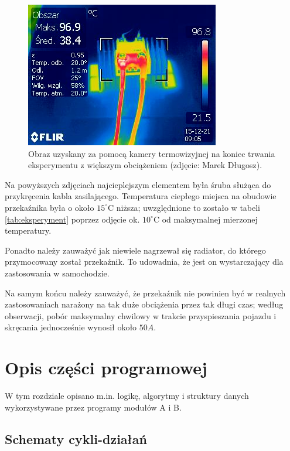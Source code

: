 \begin{figure}[H]
	\centering
	\includegraphics[scale=0.8]{flir/IR_5170.jpg}
	\caption{\label{fig:flir2}Obraz uzyskany za pomocą kamery termowizyjnej na koniec trwania eksperymentu z większym obciążeniem (zdjęcie: Marek Długosz).}
\end{figure}

Na powyższych zdjęciach najcieplejszym elementem była śruba służąca do przykręcenia kabla zasilającego. Temperatura ciepłego miejsca na obudowie przekaźnika była o około $ 15^{\circ}\mathrm{C} $ niższa; uwzględnione to zostało w tabeli \ref{tab:eksperyment} poprzez odjęcie ok. $ 10^{\circ}\mathrm{C} $ od maksymalnej mierzonej temperatury.

Ponadto należy zauważyć jak niewiele nagrzewał się radiator, do którego przymocowany został przekaźnik. To udowadnia, że jest on wystarczający dla zastosowania w samochodzie.

Na samym końcu należy zauważyć, że przekaźnik nie powinien być w realnych zastosowaniach narażony na tak duże obciążenia przez tak długi czas; według obserwacji, pobór maksymalny chwilowy w trakcie przyspieszania pojazdu i skręcania jednocześnie wynosił około $ 50A $.


\section{Opis części programowej}
\label{sec:opis_cz_programowej}

W tym rozdziale opisano m.in. logikę, algorytmy i struktury danych wykorzystywane przez programy modułów A i B.

\subsection{Schematy cykli-działań}
\label{subsec:schematy_cykli_dzialan}

